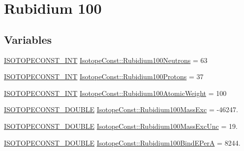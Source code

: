 \hypertarget{group___isotope_const-_rubidium-_rb100}{}\section{Rubidium 100}
\label{group___isotope_const-_rubidium-_rb100}
\subsection*{Variables}
\begin{DoxyCompactItemize}
\item 
\mbox{\hyperlink{group___isotope_const-_macros_ga5f18360b3e99483a35c32d789e62621c}{I\+S\+O\+T\+O\+P\+E\+C\+O\+N\+S\+T\+\_\+\+I\+NT}} \mbox{\hyperlink{group___isotope_const-_rubidium-_rb100_gab7d978fa247a1fee24b8817621ad4763}{Isotope\+Const\+::\+Rubidium100\+Neutrons}} = 63
\item 
\mbox{\hyperlink{group___isotope_const-_macros_ga5f18360b3e99483a35c32d789e62621c}{I\+S\+O\+T\+O\+P\+E\+C\+O\+N\+S\+T\+\_\+\+I\+NT}} \mbox{\hyperlink{group___isotope_const-_rubidium-_rb100_ga90c0ff1b9036419c5a75beedb9e97a21}{Isotope\+Const\+::\+Rubidium100\+Protons}} = 37
\item 
\mbox{\hyperlink{group___isotope_const-_macros_ga5f18360b3e99483a35c32d789e62621c}{I\+S\+O\+T\+O\+P\+E\+C\+O\+N\+S\+T\+\_\+\+I\+NT}} \mbox{\hyperlink{group___isotope_const-_rubidium-_rb100_ga1c836a3aaba072f6c6bdcdac6f225df7}{Isotope\+Const\+::\+Rubidium100\+Atomic\+Weight}} = 100
\item 
\mbox{\hyperlink{group___isotope_const-_macros_ga8f45a7272ce02c0b4c65c44636ed719a}{I\+S\+O\+T\+O\+P\+E\+C\+O\+N\+S\+T\+\_\+\+D\+O\+U\+B\+LE}} \mbox{\hyperlink{group___isotope_const-_rubidium-_rb100_gad3b94660055064d7133682e265b2a6e1}{Isotope\+Const\+::\+Rubidium100\+Mass\+Exc}} = -\/46247.
\item 
\mbox{\hyperlink{group___isotope_const-_macros_ga8f45a7272ce02c0b4c65c44636ed719a}{I\+S\+O\+T\+O\+P\+E\+C\+O\+N\+S\+T\+\_\+\+D\+O\+U\+B\+LE}} \mbox{\hyperlink{group___isotope_const-_rubidium-_rb100_ga053a92b2b62c74be3be68a2bcbc6abf5}{Isotope\+Const\+::\+Rubidium100\+Mass\+Exc\+Unc}} = 19.
\item 
\mbox{\hyperlink{group___isotope_const-_macros_ga8f45a7272ce02c0b4c65c44636ed719a}{I\+S\+O\+T\+O\+P\+E\+C\+O\+N\+S\+T\+\_\+\+D\+O\+U\+B\+LE}} \mbox{\hyperlink{group___isotope_const-_rubidium-_rb100_gad32be9924bd157eb2fce7a2285ad655d}{Isotope\+Const\+::\+Rubidium100\+Bind\+E\+PerA}} = 8244.
\item 

\end{DoxyCompactItemize}
